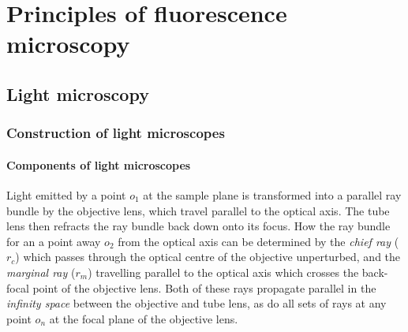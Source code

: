 

\chapter{Principles of fluorescence microscopy}


\section{Light microscopy}
\subsection{Construction of light microscopes}


\subsubsection{Components of light microscopes}
Light emitted by a point $o_1$ at the sample plane is transformed into a parallel ray bundle by the objective lens, which travel parallel to the optical axis.
The tube lens then refracts the ray bundle back down onto its focus.
How the ray bundle for an a point away $o_2$ from the optical axis can be determined by the \emph{chief ray} ($r_c$) which passes through the optical centre of the objective unperturbed, and the \emph{marginal ray} ($r_m$) travelling parallel to the optical axis which crosses the back-focal point of the objective lens.
Both of these rays propagate parallel in the \emph{infinity space} between the objective and tube lens, as do all sets of rays at any point $o_n$ at the focal plane of the objective lens.

